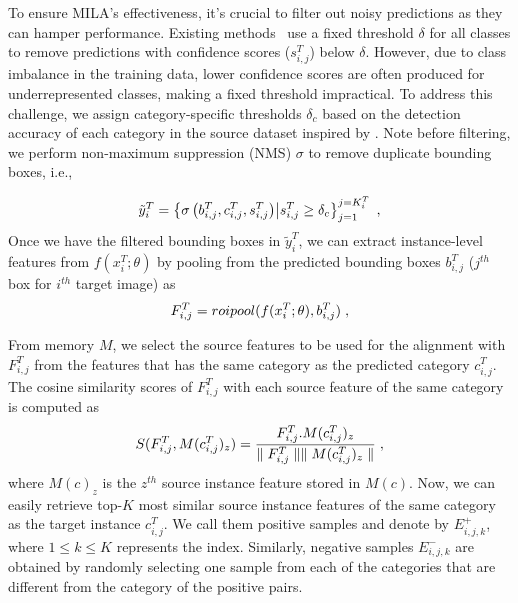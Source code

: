 \documentclass{bmvc2k}
\begin{document}
To ensure MILA's effectiveness, it's crucial to filter out noisy predictions as they can hamper performance. Existing methods~\cite{li2022cross} use a fixed threshold $\delta$ for all classes to remove predictions with confidence scores ($s_{i,j}^T$) below $\delta$. However, due to class imbalance in the training data, lower confidence scores are often produced for underrepresented classes, making a fixed threshold impractical. To address this challenge, we assign category-specific thresholds $\delta_{c}$ based on the detection accuracy of each category in the source dataset inspired by \cite{sinha2020class}.
Note before filtering, we perform non-maximum suppression (NMS) $\sigma$ to remove duplicate bounding boxes, i.e.,

\begin{equation}
    \tilde y^T_{i} =  \left\{\sigma \left(b_{i,j}^T, c_{i,j}^T, s_{i,j}^T\right) \middle| s^T_{i,j} \geq \delta_{c}\right\}^{j=K^T_i}_{j=1}   \hspace{1mm},
\end{equation}
Once we have the filtered bounding boxes in $\tilde y^T_{i}$, we can extract instance-level features from $f(x^T_i; \theta)$ by pooling from the predicted bounding boxes $b^T_{i,j}$ ($j^{th}$ box for $i^{th}$ target image) as
\begin{equation}
    F^T_{i,j} = roipool(f(x^T_i; \theta), b^T_{i,j}) \hspace{1mm},
\end{equation}


From memory $M$, we select the source features to be used for the alignment with $F^T_{i,j}$ from the features that has the same category as the predicted category $c_{i,j}^T$.
The cosine similarity scores of $F^T_{i,j}$ with each source feature of the same category is computed as
\begin{equation}
    S(F^T_{i,j}, M(c^T_{i,j})_z) = \frac{F^T_{i,j} . M(c^T_{i,j})_z}{\parallel F^T_{i,j}\parallel \parallel M(c^T_{i,j})_z\parallel} \hspace{1mm},
\end{equation}
where $M(c)_z$ is the $z^{th}$ source instance feature stored in $M(c)$.
Now, we can easily retrieve top-$K$ most similar source instance features of the same category as the target instance $c^T_{i,j}$.
We call them positive samples and denote by $E^{+}_{i,j,k}$, where $1\leq k \leq K$ represents the index. Similarly, negative samples $E^{-}_{i,j,k}$ are obtained by randomly selecting 
one sample from each of the categories that are different from the category of the positive pairs. 
\end{document}
